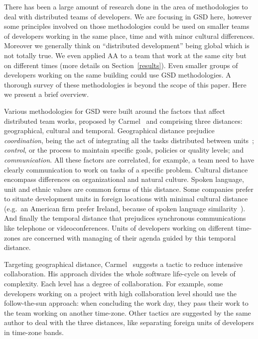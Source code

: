 \documentclass[letterpaper]{article}
\newcommand{\indraftnote}[1]{\textcolor{blue}{\texttt{\footnotesize[#1]}}}
\newcommand{\todo}[1]{\indraftnote{todo: #1}}
\begin{document}

There has been a large amount of research done in the area of
methodologies to deal with distributed teams of developers. We are
focusing in GSD here, however some principles involved on those
methodologies could be used on smaller teams of developers working in
the same place, time and with minor cultural differences. Moreover we
generally think on ``distributed development'' being global which is
not totally true. We even applied AA to a team that work at the same
city but on different times (more details on
Section~\ref{results}). Even smaller groups of developers working on
the same building could use GSD methodologies. A thorough survey of
these methodologies is beyond the scope of this paper. Here we present
a brief overview.

Various methodologies for GSD were built around the factors that
affect distributed team works, proposed by Carmel~\cite{carmel1999}
and comprising three distances: geographical, cultural and
temporal. Geographical distance prejudice \emph{coordination}, being
the act of integrating all the tasks distributed between
units~\cite{carmel2001}; \emph{control}, or the process to maintain
specific goals, policies or quality levels; and
\emph{communication}. All these factors are correlated, for example, a
team need to have clearly communication to work on tasks of a specific
problem. Cultural distance encompass differences on organizational and
natural culture. Spoken language, unit and ethnic values are common
forms of this distance. Some companies prefer to situate development
units in foreign locations with minimal cultural distance (e.g.\ an
American firm prefer Ireland, because of spoken language
similarity~\cite{carmel2001}). And finally the temporal distance that
prejudices synchronous communications like telephone or
videoconferences. Units of developers working on different time-zones
are concerned with managing of their agenda guided by this temporal
distance.

Targeting geographical distance, Carmel~\cite{carmel2001} suggests a
tactic to reduce intensive collaboration. His approach divides the
whole software life-cycle on levels of complexity. Each level has a
degree of collaboration. For example, some developers working on a
project with high collaboration level should use the follow-the-sun
approach: when concluding the work day, they pass their work to the
team working on another time-zone. Other tactics are suggested by the
same author to deal with the three distances, like separating foreign
units of developers in time-zone bands.
\end{document}
